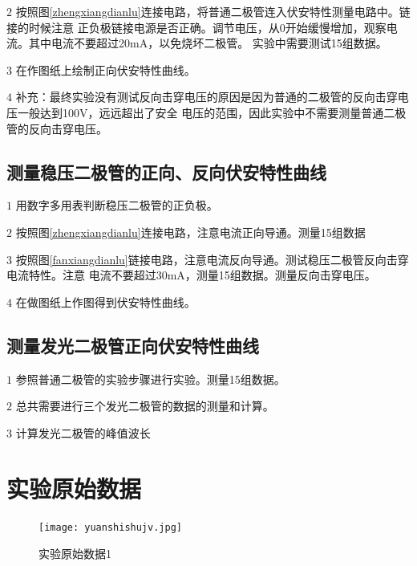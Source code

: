 \documentclass{ctexart}
\begin{document}
  \(2\) 按照图\ref{zhengxiangdianlu}连接电路，将普通二极管连入伏安特性测量电路中。链接的时候注意
        正负极链接电源是否正确。调节电压，从0开始缓慢增加，观察电流。其中电流不要超过20mA，以免烧坏二极管。
        实验中需要测试15组数据。

  \(3\) 在作图纸上绘制正向伏安特性曲线。

  \(4\) 补充：最终实验没有测试反向击穿电压的原因是因为普通的二极管的反向击穿电压一般达到100V，远远超出了安全
        电压的范围，因此实验中不需要测量普通二极管的反向击穿电压。

  \subsection{测量稳压二极管的正向、反向伏安特性曲线}
  \(1\) 用数字多用表判断稳压二极管的正负极。
  
  \(2\) 按照图\ref{zhengxiangdianlu}连接电路，注意电流正向导通。测量15组数据

  \(3\) 按照图\ref{fanxiangdianlu}链接电路，注意电流反向导通。测试稳压二极管反向击穿电流特性。注意
        电流不要超过30mA，测量15组数据。测量反向击穿电压。

  \(4\) 在做图纸上作图得到伏安特性曲线。

  \subsection{测量发光二极管正向伏安特性曲线}
  \(1\) 参照普通二极管的实验步骤进行实验。测量15组数据。

  \(2\) 总共需要进行三个发光二极管的数据的测量和计算。

  \(3\) 计算发光二极管的峰值波长
\newpage


\section{实验原始数据}
\begin{figure}[h]
  \centering
  \texttt{[image: yuanshishujv.jpg]}
  \caption{实验原始数据1}\label{yuanshishujv}
\end{figure}



















\newpage
\end{document}

